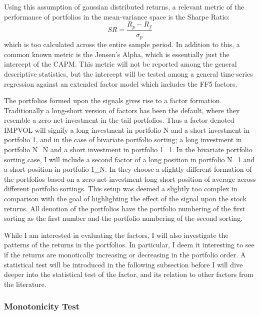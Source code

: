 Using this assumption of gaussian distributed returns, a relevant metric of the performance of portfolios in the mean-variance space is the Sharpe Ratio:
\begin{equation}
	SR = \frac{R_{p}-R_{f}}{\sigma_{p}}
\end{equation}
which is too calculated across the entire sample period. In addition to this, a common known metric is the Jensen's Alpha, which is essentially just the intercept of the CAPM. This metric will not be reported among the general descriptive statistics, but the intercept will be tested among a general time-series regression against an extended factor model which includes the FF5 factors.

The portfolios formed upon the signals gives rise to a factor formation. Traditionally a long-short version of factors has been the default, where they resemble a zero-net-investment in the tail portfolios. Thus a factor denoted IMPVOL will signify a long investment in portfolio N and a short investment in portfolio 1, and in the case of bivariate portfolio sorting; a long investment in portfolio N\_N and a short investment in portfolio 1\_1. In the bivariate portfolio sorting case, I will include a second factor of a long position in portfolio N\_1 and a short position in portfolio 1\_N. In \cite{fama2015five} they choose a slightly different formation of the portfolios based on a zero-net-investment long-short position of average across different portfolio sortings. This setup was deemed a slightly too complex in comparison with the goal of highlighting the effect of the signal upon the stock returns. All denotion of the portfolios have the portfolio numbering of the first sorting as the first number and the portfolio numbering of the second sorting.

While I am interested in evaluating the factors, I will also investigate the patterns of the returns in the portfolios. In particular, I deem it interesting to see if the returns are monotically increasing or decreasing in the portfolio order. A statistical test will be introduced in the following subsection before I will dive deeper into the statistical test of the factor, and its relation to other factors from the literature.

\subsubsection{Monotonicity Test}

